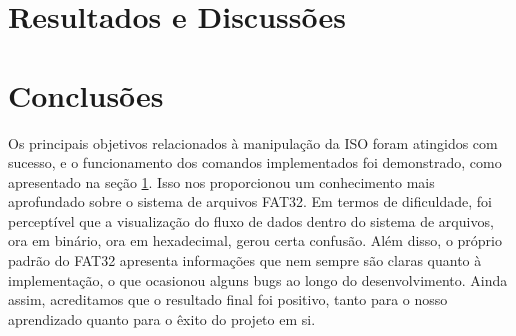 \documentclass[
    12pt,				%
    oneside,   	        %
    a4paper,			%
    english,			%
    french,				%
    spanish,			%
    brazil,				%
    ]{pacotes/abntex2}
\begin{document}
\section{Resultados e Discussões}
\label{sec:discussao}

\section{Conclusões}
\label{sec:conclusoes}
Os principais objetivos relacionados à manipulação da ISO foram atingidos com sucesso, e o funcionamento dos comandos implementados foi demonstrado, como apresentado na seção \ref{sec:discussao}. Isso nos proporcionou um conhecimento mais aprofundado sobre o sistema de arquivos FAT32.
Em termos de dificuldade, foi perceptível que a visualização do fluxo de dados dentro do sistema de arquivos, ora em binário, ora em hexadecimal, gerou certa confusão. Além disso, o próprio padrão do FAT32 apresenta informações que nem sempre são claras quanto à implementação, o que ocasionou alguns bugs ao longo do desenvolvimento.
Ainda assim, acreditamos que o resultado final foi positivo, tanto para o nosso aprendizado quanto para o êxito do projeto em si.

\postextual
\renewcommand{\bibsection}{%
\section{\bibname}
\bibmark
\prebibhook}


\end{document}
